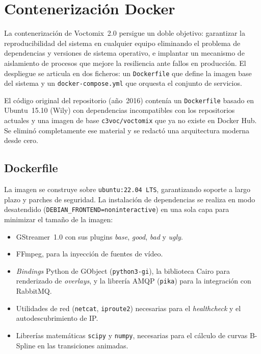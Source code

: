 \section{Contenerización Docker}
\label{sec:docker}

La contenerización de Voctomix~2.0 persigue un doble objetivo: garantizar la
reproducibilidad del sistema en cualquier equipo eliminando el problema de dependencias
y versiones de sistema operativo, e implantar un mecanismo de aislamiento de procesos
que mejore la resiliencia ante fallos en producción. El despliegue se articula en dos
ficheros: un \texttt{Dockerfile} que define la imagen base del sistema y un
\texttt{docker-compose.yml} que orquesta el conjunto de servicios.

El código original del repositorio (año~2016) contenía un \texttt{Dockerfile} basado
en Ubuntu~15.10 (Wily) con dependencias incompatibles con los repositorios actuales y
una imagen de base \texttt{c3voc/voctomix} que ya no existe en Docker Hub. Se eliminó
completamente ese material y se redactó una arquitectura moderna desde cero.

\subsection{Dockerfile}

La imagen se construye sobre \texttt{ubuntu:22.04~LTS}, garantizando soporte a largo
plazo y parches de seguridad. La instalación de dependencias se realiza en modo
desatendido (\texttt{DEBIAN\_FRONTEND=noninteractive}) en una sola capa para minimizar
el tamaño de la imagen:

\begin{itemize}
  \item GStreamer~1.0 con sus plugins \textit{base}, \textit{good}, \textit{bad} y
        \textit{ugly}.
  \item FFmpeg, para la inyección de fuentes de vídeo.
  \item \textit{Bindings} Python de GObject (\texttt{python3-gi}), la biblioteca Cairo
        para renderizado de \textit{overlays}, y la librería AMQP (\texttt{pika}) para la
        integración con RabbitMQ.
  \item Utilidades de red (\texttt{netcat}, \texttt{iproute2}) necesarias para el
        \textit{healthcheck} y el autodescubrimiento de IP.
  \item Librerías matemáticas \texttt{scipy} y \texttt{numpy}, necesarias para el
        cálculo de curvas B-Spline en las transiciones animadas.
\end{itemize}

